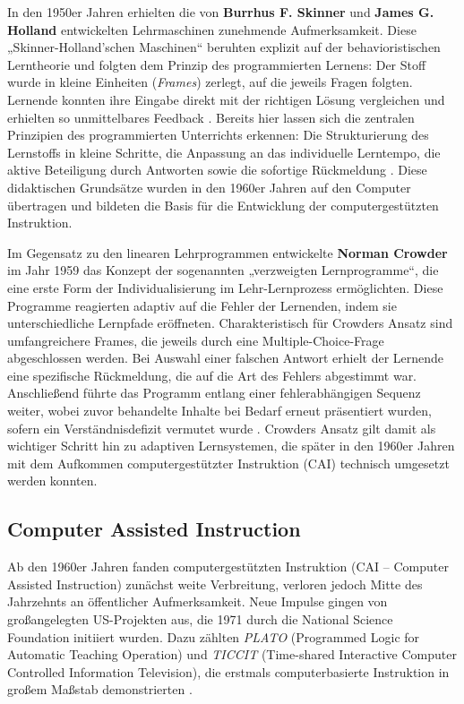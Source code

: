 In den 1950er Jahren erhielten die von \textbf{Burrhus F. Skinner} und \textbf{James G. Holland} entwickelten Lehrmaschinen zunehmende Aufmerksamkeit. Diese „Skinner-Holland’schen Maschinen“ beruhten explizit auf der behavioristischen Lerntheorie und folgten dem Prinzip des programmierten Lernens: Der Stoff wurde in kleine Einheiten (\textit{Frames}) zerlegt, auf die jeweils Fragen folgten. Lernende konnten ihre Eingabe direkt mit der richtigen Lösung vergleichen und erhielten so unmittelbares Feedback \parencite[S.~970--977]{skinner_teaching_1958}. Bereits hier lassen sich die zentralen Prinzipien des programmierten Unterrichts erkennen: Die Strukturierung des Lernstoffs in kleine Schritte, die Anpassung an das individuelle Lerntempo, die aktive Beteiligung durch Antworten sowie die sofortige Rückmeldung \parencite[S.~1971]{bruillard_teaching_2020}. Diese didaktischen Grundsätze wurden in den 1960er Jahren auf den Computer übertragen und bildeten die Basis für die Entwicklung der computergestützten Instruktion.

Im Gegensatz zu den linearen Lehrprogrammen entwickelte \textbf{Norman Crowder} im Jahr 1959 das Konzept der sogenannten „verzweigten Lernprogramme“, die eine erste Form der Individualisierung im Lehr-Lernprozess ermöglichten. Diese Programme reagierten adaptiv auf die Fehler der Lernenden, indem sie unterschiedliche Lernpfade eröffneten. Charakteristisch für Crowders Ansatz sind umfangreichere Frames, die jeweils durch eine Multiple-Choice-Frage abgeschlossen werden. Bei Auswahl einer falschen Antwort erhielt der Lernende eine spezifische Rückmeldung, die auf die Art des Fehlers abgestimmt war. Anschließend führte das Programm entlang einer fehlerabhängigen Sequenz weiter, wobei zuvor behandelte Inhalte bei Bedarf erneut präsentiert wurden, sofern ein Verständnisdefizit vermutet wurde \parencites[S.~252--254]{crowder_differences_1963}[S.~9]{schonfeld_computerbasiertes_2006}. Crowders Ansatz gilt damit als wichtiger Schritt hin zu adaptiven Lernsystemen, die später in den 1960er Jahren mit dem Aufkommen computergestützter Instruktion (CAI) technisch umgesetzt werden konnten.

\subsection{Computer Assisted Instruction}

 Ab den 1960er Jahren fanden computergestützten Instruktion (CAI – Computer Assisted Instruction) zunächst weite Verbreitung, verloren jedoch Mitte des Jahrzehnts an öffentlicher Aufmerksamkeit. Neue Impulse gingen von großangelegten US-Projekten aus, die 1971 durch die National Science Foundation initiiert wurden. Dazu zählten \textit{PLATO} (Programmed Logic for Automatic Teaching Operation) und \textit{TICCIT} (Time-shared Interactive Computer Controlled Information Television), die erstmals computerbasierte Instruktion in großem Maßstab demonstrierten \parencites[S.~7]{niegemann_kompendium_2008}[S.~69ff]{oshea_lernen_1986}.

